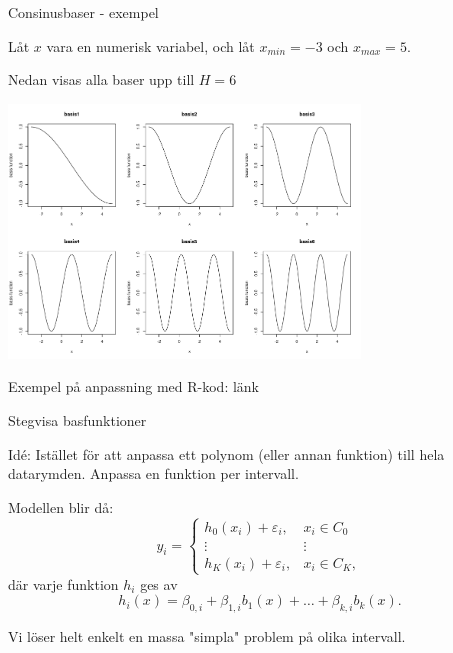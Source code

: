 \documentclass[10pt,english]{beamer}
\begin{document}
\begin{frame}{Consinusbaser - exempel}

Låt $x$ vara en numerisk variabel, och låt $x_{min}=-3$ och $x_{max}=5$. 

Nedan visas alla baser upp till $H=6$

\includegraphics[width=0.7\textwidth]{figs/cosinus_basis_func_example.png}

Exempel på anpassning med R-kod: länk

\end{frame}


\begin{frame}{Stegvisa basfunktioner}

    \begin{greenbox}
        Idé: Istället för att anpassa ett polynom (eller annan funktion) till hela datarymden. Anpassa en funktion per intervall.
    \end{greenbox}

    Modellen blir då:
    \begin{equation*}
        y_i = \begin{cases}
            h_0(x_i) + \varepsilon_i, & x_i \in C_0 \\
            \vdots & \vdots \\
            h_K(x_i) + \varepsilon_i, & x_i \in C_K,
        \end{cases}
    \end{equation*}
    där varje funktion $h_i$ ges av
    \begin{equation*}
        h_i(x) = \beta_{0,i} + \beta_{1,i} b_1(x) + \ldots + \beta_{k,i} b_k(x).
    \end{equation*}

    Vi löser helt enkelt en massa "simpla" problem på olika intervall.
    
\end{frame}
\end{document}
